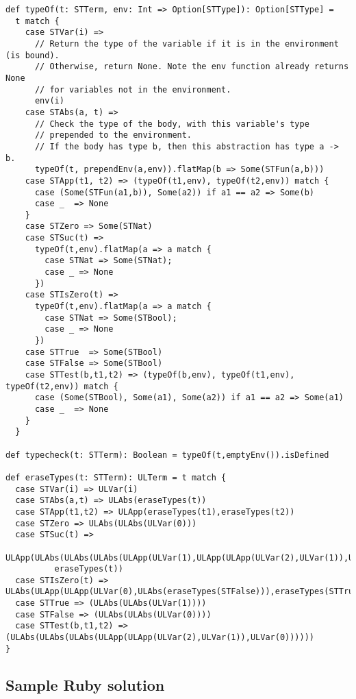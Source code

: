 \documentclass[11pt]{article}
\theoremstyle{definition}
\begin{document}
\begin{verbatim}
def typeOf(t: STTerm, env: Int => Option[STType]): Option[STType] =
  t match {
    case STVar(i) =>
      // Return the type of the variable if it is in the environment (is bound).
      // Otherwise, return None. Note the env function already returns None
      // for variables not in the environment.
      env(i)
    case STAbs(a, t) =>
      // Check the type of the body, with this variable's type
      // prepended to the environment.
      // If the body has type b, then this abstraction has type a -> b.
      typeOf(t, prependEnv(a,env)).flatMap(b => Some(STFun(a,b)))
    case STApp(t1, t2) => (typeOf(t1,env), typeOf(t2,env)) match {
      case (Some(STFun(a1,b)), Some(a2)) if a1 == a2 => Some(b)
      case _  => None 
    }
    case STZero => Some(STNat)
    case STSuc(t) =>
      typeOf(t,env).flatMap(a => a match {
        case STNat => Some(STNat);
        case _ => None
      })
    case STIsZero(t) =>
      typeOf(t,env).flatMap(a => a match {
        case STNat => Some(STBool);
        case _ => None
      })
    case STTrue  => Some(STBool)
    case STFalse => Some(STBool)
    case STTest(b,t1,t2) => (typeOf(b,env), typeOf(t1,env), typeOf(t2,env)) match {
      case (Some(STBool), Some(a1), Some(a2)) if a1 == a2 => Some(a1)
      case _  => None 
    }
  }

def typecheck(t: STTerm): Boolean = typeOf(t,emptyEnv()).isDefined

def eraseTypes(t: STTerm): ULTerm = t match {
  case STVar(i) => ULVar(i)
  case STAbs(a,t) => ULAbs(eraseTypes(t))
  case STApp(t1,t2) => ULApp(eraseTypes(t1),eraseTypes(t2))
  case STZero => ULAbs(ULAbs(ULVar(0)))
  case STSuc(t) =>
    ULApp(ULAbs(ULAbs(ULAbs(ULApp(ULVar(1),ULApp(ULApp(ULVar(2),ULVar(1)),ULVar(0)))))),
          eraseTypes(t))
  case STIsZero(t) => ULAbs(ULApp(ULApp(ULVar(0),ULAbs(eraseTypes(STFalse))),eraseTypes(STTrue)))
  case STTrue => (ULAbs(ULAbs(ULVar(1))))
  case STFalse => (ULAbs(ULAbs(ULVar(0))))
  case STTest(b,t1,t2) => (ULAbs(ULAbs(ULAbs(ULApp(ULApp(ULVar(2),ULVar(1)),ULVar(0))))))
}
\end{verbatim}
\subsection*{Sample Ruby solution}
\label{sec:orgcb684de}
\end{document}
